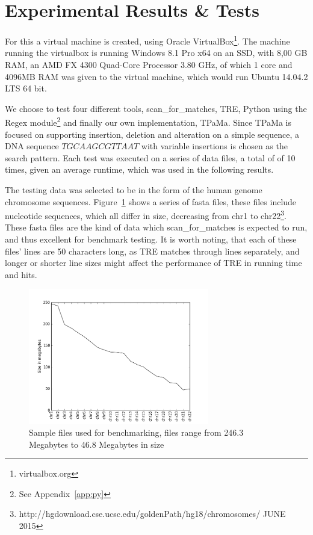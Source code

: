 \section{Experimental Results \& Tests}
For this a virtual machine is created, using Oracle VirtualBox\footnote{virtualbox.org}. The machine running the virtualbox is running Windows 8.1 Pro x64 on an SSD, with 8,00 GB RAM, an AMD FX 4300 Quad-Core Processor 3.80 GHz, of which 1 core and 4096MB RAM was given to the virtual machine, which would run Ubuntu 14.04.2 LTS 64 bit.

We choose to test four different tools, scan\_for\_matches, TRE, Python using the Regex module\footnote{See Appendix~\ref{app:py}} and finally our own implementation, TPaMa. Since TPaMa is focused on supporting insertion, deletion and alteration on a simple sequence, a DNA sequence $TGCAAGCGTTAAT$ with variable insertions is chosen as the search pattern. Each test was executed on a series of data files, a total of of 10 times, given an average runtime, which was used in the following results.


The testing data was selected to be in the form of the human genome chromosome sequences. Figure~\ref{fig:size} shows a series of fasta files, these files include nucleotide sequences, which all differ in size, decreasing from chr1 to chr22\footnote{http://hgdownload.cse.ucsc.edu/goldenPath/hg18/chromosomes/ JUNE 2015}. These fasta files are the kind of data which scan\_for\_matches is expected to run, and thus excellent for benchmark testing. It is worth noting, that each of these files' lines are 50 characters long, as TRE matches through lines separately, and longer or shorter line sizes might affect the performance of TRE in running time and hits.%
\begin{figure}[h!]
\centering
\includegraphics[width=0.7\textwidth]{Benchmarking/size.png}
\caption{Sample files used for benchmarking, files range from 246.3 Megabytes to 46.8 Megabytes in size}
\label{fig:size}
\end{figure}

